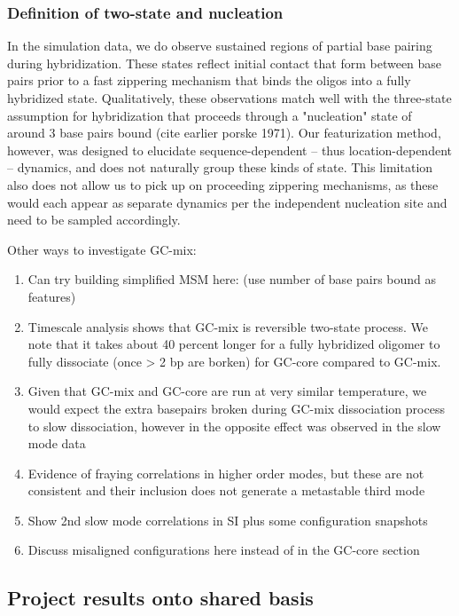 \documentclass[journal=jpcbfk,manuscript=article]{achemso}
\begin{document}
\subsubsection{\label{sec:Results}Definition of two-state and nucleation}

In the simulation data, we do observe sustained regions of partial base pairing during hybridization. These states reflect initial contact that form between base pairs prior to a fast zippering mechanism that binds the oligos into a fully hybridized state. Qualitatively, these observations match well with the three-state assumption for hybridization that proceeds through a "nucleation" state of around 3 base pairs bound \citep{Yin2011KineticsHybridization} \citep{} (cite earlier porske 1971). Our featurization method, however, was designed to elucidate sequence-dependent -- thus location-dependent -- dynamics, and does not naturally group these kinds of state. This limitation also does not allow us to pick up on proceeding zippering mechanisms, as these would each appear as separate dynamics per the independent nucleation site and need to be sampled accordingly.

Other ways to investigate GC-mix:
\begin{enumerate}
	\item Can try building simplified MSM here: (use number of base pairs bound as features)
    \item Timescale analysis shows that GC-mix is reversible two-state process. We note that it takes about 40 percent longer for a fully hybridized oligomer to fully dissociate (once > 2 bp are borken) for GC-core compared to GC-mix. 
	\item Given that GC-mix and GC-core are run at very similar temperature, we would expect the extra basepairs broken during GC-mix dissociation process to slow dissociation, however in the opposite effect was observed in the slow mode data
	\item Evidence of fraying correlations in higher order modes, but these are not consistent and their inclusion does not generate a metastable third mode
	\item Show 2nd slow mode correlations in SI plus some configuration snapshots
	\item Discuss misaligned configurations here instead of in the GC-core section
\end{enumerate} 
 
\subsection{\label{sec:Results}Project results onto shared basis}
\end{document}
